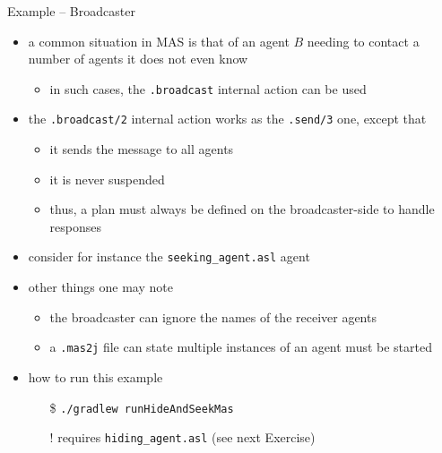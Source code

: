 \documentclass[presentation]{beamer}\mode<presentation>{\usetheme{AMSBolognaFC}}
\begin{document}
\begin{frame}[c, allowframebreaks]{Example \theJasonExample{} -- Broadcaster}
\begin{itemize}
    
    \item a common situation in MAS is that of an agent $B$ needing to contact a number of agents it does not even know
    \begin{itemize}
        \item in such cases, the \texttt{.broadcast} internal action can be used
    \end{itemize}
    
    \vspace{.3cm}
    
    \item the \texttt{.broadcast/2} internal action works as the \texttt{.send/3} one, except that 
    \begin{itemize}
        \item it sends the message to all agents
        \item it is never suspended
        \item thus, a plan must always be defined on the broadcaster-side to handle responses
    \end{itemize}
    
    \framebreak
    
    \item consider for instance the \texttt{seeking\_agent.asl} agent
    
    
    \vspace{.3cm}
    
    \item other things one may note
    \begin{itemize}
        \item the broadcaster can ignore the names of the receiver agents
        \item a \texttt{.mas2j} file can state multiple instances of an agent must be started
    \end{itemize}
    
    \vspace{.3cm}
    
    \item how to run this example
    \begin{itemize}
        \item[\$] \texttt{./gradlew run\alert{HideAndSeek}Mas}
        \item[!] requires \texttt{hiding\_agent.asl} (see next Exercise) 
    \end{itemize}
    
\end{itemize}
\end{frame}
\end{document}
